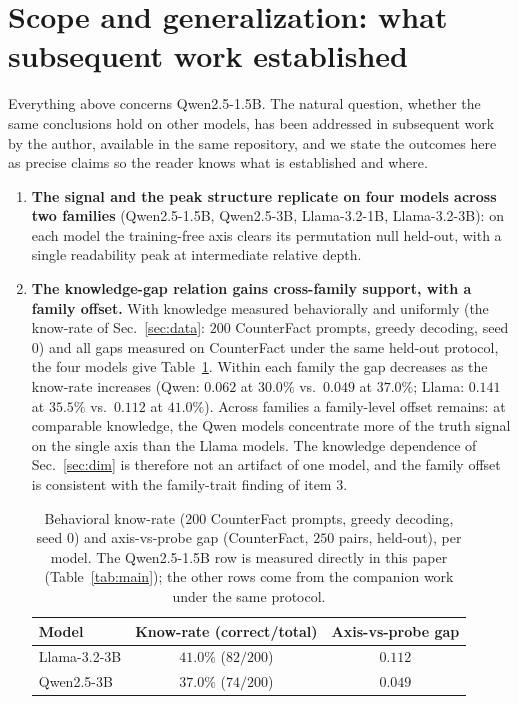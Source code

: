 \documentclass[11pt]{article}
\begin{document}
\section{Scope and generalization: what subsequent work established}
\label{sec:generalization}

Everything above concerns Qwen2.5-1.5B. The natural question, whether the
same conclusions hold on other models, has been addressed in subsequent work
by the author, available in the same repository, and we state the outcomes
here as precise claims so the reader knows what is established and where.

\begin{enumerate}
\item \textbf{The signal and the peak structure replicate on four models
across two families} (Qwen2.5-1.5B, Qwen2.5-3B, Llama-3.2-1B, Llama-3.2-3B):
on each model the training-free axis clears its permutation null held-out,
with a single readability peak at intermediate relative depth.
\item \textbf{The knowledge-gap relation gains cross-family support, with a
family offset.} With knowledge measured behaviorally and uniformly (the
know-rate of Sec.~\ref{sec:data}: $200$ CounterFact prompts, greedy decoding,
seed $0$) and all gaps measured on CounterFact under the same held-out
protocol, the four models give Table~\ref{tab:knowgap}. Within each family
the gap decreases as the know-rate increases (Qwen: $0.062$ at $30.0\%$ vs.\
$0.049$ at $37.0\%$; Llama: $0.141$ at $35.5\%$ vs.\ $0.112$ at $41.0\%$).
Across families a family-level offset remains: at comparable knowledge, the
Qwen models concentrate more of the truth signal on the single axis than the
Llama models. The knowledge dependence of Sec.~\ref{sec:dim} is therefore not
an artifact of one model, and the family offset is consistent with the
family-trait finding of item 3.
\begin{table}[H]
\centering
\caption{Behavioral know-rate ($200$ CounterFact prompts, greedy decoding,
seed $0$) and axis-vs-probe gap (CounterFact, $250$ pairs, held-out), per
model. The Qwen2.5-1.5B row is measured directly in this paper
(Table~\ref{tab:main}); the other rows come from the companion work under the
same protocol.}
\label{tab:knowgap}
\begin{tabular}{lcc}
\toprule
Model & Know-rate (correct/total) & Axis-vs-probe gap \\
\midrule
Llama-3.2-3B & $41.0\%$ ($82/200$) & $0.112$ \\
Qwen2.5-3B   & $37.0\%$ ($74/200$) & $0.049$ \\

\end{tabular}
\end{table}
\end{enumerate}
\end{document}
